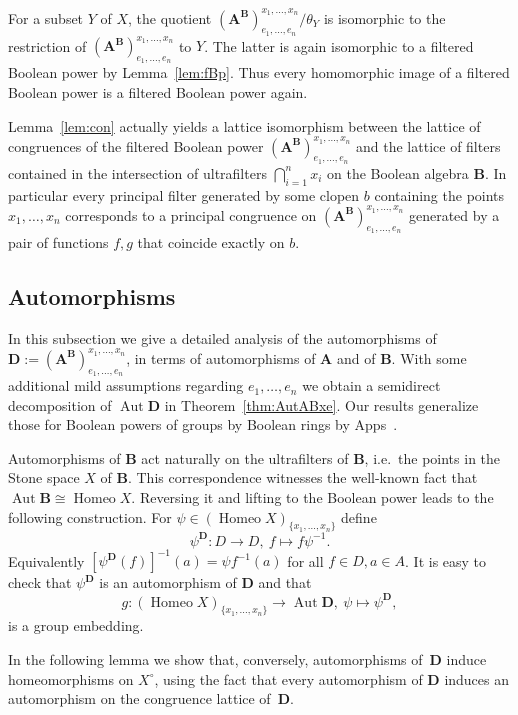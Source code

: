 \documentclass[12pt,a4paper,reqno]{amsart}
\numberwithin{equation}{section}
\theoremstyle{plain}
\theoremstyle{definition}
\newcommand{\A}{\mathbf{A}}
\newcommand{\ABxe}{(\mathbf{A^B})^{x_1,\dots,x_n}_{e_1,\dots,e_n}}
\newcommand{\B}{\mathbf{B}}
\newcommand{\D}{\mathbf{D}}
\DeclareMathOperator{\Aut}{Aut}
\DeclareMathOperator{\Homeo}{Homeo}
\begin{document}
 For a subset $Y$ of $X$, the quotient $\ABxe/\theta_Y$ is isomorphic to the restriction of $\ABxe$ to $Y$.
 The latter is again isomorphic to a filtered Boolean power by Lemma~\ref{lem:fBp}.
 Thus every homomorphic image of a filtered Boolean power is a filtered Boolean power again.

 Lemma~\ref{lem:con} actually yields a lattice isomorphism between the lattice of congruences
 of the filtered Boolean power $\ABxe$ and the lattice of filters contained in the intersection of ultrafilters
 $\bigcap_{i=1}^n x_i$ on the Boolean algebra $\B$. In particular every principal filter generated by some clopen
 $b$ containing the points $x_1,\dots,x_n$ corresponds to a principal congruence on $\ABxe$ generated by a pair of
 functions $f,g$ that coincide exactly on $b$.
 

\subsection{Automorphisms} \label{sec:autos}

In this subsection we give a detailed analysis of the automorphisms of $\D := \ABxe$,
in terms of automorphisms of $\A$ and of $\B$.
With some additional mild assumptions regarding $e_1,\dots,e_n$ we obtain a semidirect decomposition of 
$\Aut \D$ in Theorem~\ref{thm:AutABxe}.
 Our results generalize those for Boolean powers of groups by Boolean rings
 by Apps~\cite[Theorem C]{Ap:BPG}.

 Automorphisms of $\B$ act naturally on the ultrafilters of $\B$, 
 i.e.\ the points in  the Stone space $X$ of $\B$.
This correspondence witnesses the well-known fact that $\Aut\B\cong\Homeo X$.
 Reversing it and lifting to the Boolean power leads to the following construction.
 For $\psi\in (\Homeo X)_{\{x_1,\dots,x_n\}}$ define
\begin{equation} \label{eq:defpsiD}
 \psi^\D\colon D\to D,\ f\mapsto f\psi^{-1}. 
\end{equation}
Equivalently $[\psi^\D(f)]^{-1} (a) = \psi f^{-1}(a)$ for all $f\in D, a\in A$.
 It is easy to check that $\psi^\D$ is an automorphism of $\D$ and that
\begin{equation} \label{eq:defg}
  g\colon (\Homeo X)_{\{x_1,\dots,x_n\}} \to \Aut\D,\ \psi\mapsto\psi^\D,
\end{equation}
is a group embedding.

In the following lemma we show that, conversely, automorphisms of~$\D$ induce homeomorphisms on $X^\circ$, using the fact that every automorphism of $\D$ induces an automorphism on the congruence lattice of~$\D$.
\end{document}

